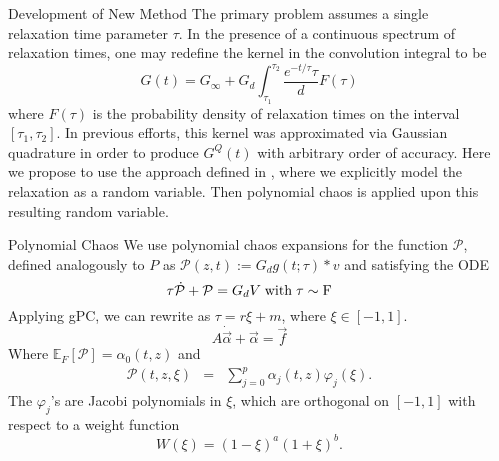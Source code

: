 \documentclass[final]{beamer} %
\renewcommand{\phi}{\varphi}
\newcommand{\field}[1]{\mathbb{#1}} %
\newcommand{\script}[1]{\mathcal{#1}} %
\begin{document}
\begin{frame}[t]
\begin{columns}[t]
\begin{column}{0.28\paperwidth}
\end{column}
\begin{column}{0.28\paperwidth}

\begin{alertblock}{Development of New Method}
The primary problem assumes a single relaxation time parameter $\tau$. In the
presence of a continuous spectrum of relaxation times, one may redefine the kernel in
the convolution integral to be
\[
G(t) = G_{\infty} + G_d \int_{\tau_1}^{\tau_2} \frac{e^{-t/\tau}{\tau}} dF(\tau)
\]
where $F(\tau)$ is the probability density of relaxation times on the interval $[\tau_1,
\tau_2]$. In previous efforts, this kernel was approximated via Gaussian quadrature
in order to produce $G^Q (t)$ with arbitrary order of accuracy. Here we propose to use
the approach defined in \cite{gibson}, where we explicitly model the relaxation as a
random variable. Then polynomial chaos is applied upon this resulting random variable.
\end{alertblock}

\begin{block}{Polynomial Chaos}
We use polynomial chaos expansions for the function $\script{P}$, defined analogously
to $P$ as $\script{P} (z, t) := G_d g(t; \tau) * v$ and satisfying the ODE
\begin{equation}
\tau \dot{\script{P}} + \script{P} = G_d V \;\rm{with}\; \tau \sim F
\end{equation}
Applying gPC, we can rewrite as $\tau = r\xi+m$, where $\xi \in [-1,1]$.
\begin{equation} \label{eqn:alpha_m}
A \dot{\vec{\alpha}} + \vec{\alpha} = \vec{f}
\end{equation} 
Where $\field{E}_F \left[\script{P}\right] = \alpha_0 (t,z)$ and
\begin{eqnarray}
\script{P}(t,z,\xi) & = & \sum_{j=0}^{p} \alpha_j (t,z) \phi_j(\xi).
\label{eqn2}
\end{eqnarray}
The $\phi_j$'s are Jacobi polynomials in $\xi$, which are orthogonal on $[-1,1]$ with
respect to a weight function
\[W(\xi) = (1-\xi)^a (1+\xi)^b.\]
\end{block}


\end{column}
\end{columns}
\end{frame}
\end{document}
